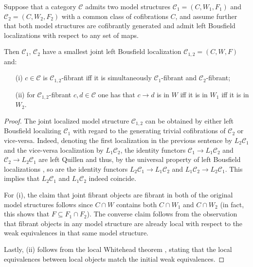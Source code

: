\documentclass[a4paper,10pt
,draft
]{article}%
\begin{document}
\begin{proposition}\label{COMBMODSTR PROP}
	Suppose that a category $\mathcal{C}$
	admits two model structures $\mathcal{C}_1=(C,W_1,F_1)$ and $\mathcal{C}_2 = (C,W_2,F_2)$
	with a common class of cofibrations $C$,
	and assume further that both model structures are cofibrantly generated and admit left Bousfield localizations with respect to any set of maps.

	Then $\mathcal{C}_1$, $\mathcal{C}_2$ have a smallest joint left Bousfield localization 
	$\mathcal{C}_{1,2}=(C,W,F)$ and:
\begin{itemize}
	\item[(i)] $c \in \mathcal{C}$ is $\mathcal{C}_{1,2}$-fibrant iff it is simultaneously 
	$\mathcal{C}_{1}$-fibrant and $\mathcal{C}_{2}$-fibrant;
	\item[(ii)] for $\mathcal{C}_{1,2}$-fibrant  
	$c,d \in \mathcal{C}$ one has that $c\to d$ is in $W$ iff it is in $W_1$ iff it is in $W_2$.
\end{itemize}
\end{proposition}


\begin{proof}
The joint localized model structure $\mathcal{C}_{1,2}$ can be obtained by either left Bousfield localizing $\mathcal{C}_{1}$ with regard to the generating trivial cofibrations of $\mathcal{C}_{2}$ or vice-versa. Indeed, denoting the first localization in the previous sentence by $L_2 \mathcal{C}_1$ and the vice-versa localization by $L_1 \mathcal{C}_2$,
the identity functors 
$\mathcal{C}_1 \to L_1 \mathcal{C}_2$ and
$\mathcal{C}_2 \to L_2 \mathcal{C}_1$
are left Quillen and thus, by the universal property of left Bousfield localizations \cite[Prop. 3.3.18]{Hir03}, so are the identity functors
$L_2 \mathcal{C}_1 \to L_1 \mathcal{C}_2$ and 
$L_1 \mathcal{C}_2 \to L_2 \mathcal{C}_1$. This implies that $L_2 \mathcal{C}_1$ and $L_1 \mathcal{C}_2$ indeed coincide.
	
For (i), the claim that joint fibrant objects are fibrant in both of the original model structures follows since $C \cap W$ contains both $C \cap W_1$ and $C \cap W_2$ (in fact, this shows that $F \subseteq F_1 \cap F_2$).
The converse claim follows from the observation that fibrant objects in any model structure are already local with respect to the weak equivalences in that same model structure.

Lastly, (ii) follows from the local Whitehead theorem \cite[Thm. 3.2.13]{Hir03}, stating that 
the local equivalences between local objects match the
initial weak equivalences.
\end{proof}
\end{document}
